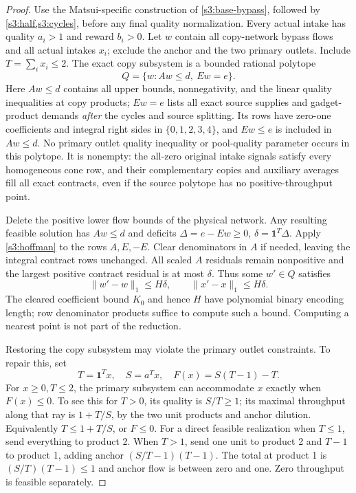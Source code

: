 \begin{proof}
Use the Matsui-specific construction of \cref{s3:base-bypass}, followed
by \cref{s3:half,s3:cycles}, before any final quality normalization.
Every actual intake has quality $a_i>1$ and reward $b_i>0$. Let $w$
contain all copy-network bypass flows and all actual intakes $x_i$;
exclude the anchor and the two primary outlets. Include
$T=\sum_i x_i\le2$. The exact copy subsystem is a bounded rational
polytope
\[
 Q=\{w:Aw\le d,\ Ew=e\}.
\]
Here $Aw\le d$ contains all upper bounds, nonnegativity, and the
linear quality inequalities at copy products; $Ew=e$ lists all exact
source supplies and gadget-product demands \emph{after} the cycles and
source splitting. Its rows have zero-one coefficients and integral
right sides in $\{0,1,2,3,4\}$, and $Ew\le e$ is included in $Aw\le d$.
No primary outlet quality inequality or pool-quality parameter occurs
in this polytope. It is nonempty: the all-zero original intake signals
satisfy every homogeneous cone row, and their complementary copies and
auxiliary averages fill all exact contracts, even if the source polytope
has no positive-throughput point.

Delete the positive lower flow bounds of the physical network. Any
resulting feasible solution has $Aw\le d$ and deficits
$\Delta=e-Ew\ge0$, $\delta=\mathbf1^T\Delta$.
Apply \cref{s3:hoffman} to the rows $A,E,-E$. Clear denominators in
$A$ if needed, leaving the integral contract rows unchanged. All scaled
$A$ residuals remain nonpositive and the largest positive contract
residual is at most $\delta$. Thus some $w'\in Q$ satisfies
\begin{equation}
 \|w'-w\|_1\le H\delta,
 \qquad \|x'-x\|_1\le H\delta.\label{s3:restore-copy}
\end{equation}
The cleared coefficient bound $K_0$ and hence $H$ have polynomial
binary encoding length; row denominator products suffice to compute
such a bound. Computing a nearest point is not part of the reduction.

Restoring the copy subsystem may violate the primary outlet constraints.
To repair this, set
\[
 T=\mathbf1^Tx,\quad S=a^Tx,\quad F(x)=S(T-1)-T.
\]
For $x\ge0,T\le2$, the primary subsystem can accommodate $x$ exactly
when $F(x)\le0$. To see this for $T>0$, its quality is $S/T\ge1$;
its maximal throughput along that ray is $1+T/S$, by the two unit
products and anchor dilution. Equivalently $T\le1+T/S$, or $F\le0$.
For a direct feasible realization when $T\le1$, send everything to
product 2. When $T>1$, send one unit to product 2 and $T-1$ to product 1,
adding anchor $(S/T-1)(T-1)$. The total at product 1 is
$(S/T)(T-1)\le1$ and anchor flow is between zero and one.
Zero throughput is feasible separately.


\end{proof}
